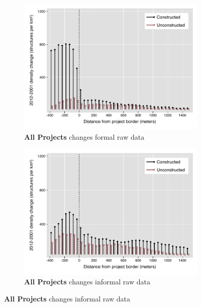 \documentclass[12pt]{article}
\begin{document}
\begin{figure}
        \centering
        \begin{subfigure}[b]{0.48\textwidth}
            \caption[Network2]%
            {{\footnotesize \textbf{All Projects} changes formal raw data}}    
            \label{fig:prefor}
            \centering
            \includegraphics[width=\textwidth,trim={0.3cm .3cm 0.1cm 0cm}, clip=true]{figures/bblu_for_rawchanges_4_30k.pdf}

        \end{subfigure}
        \hfill
        \begin{subfigure}[b]{0.48\textwidth}  
                    \caption[]%
            {{\footnotesize \textbf{All Projects} changes informal  raw data}}      
            \label{fig:preinf}
            \centering 
            \includegraphics[width=\textwidth,trim={0.3cm .3cm 0.1cm 0cm}, clip=true]{figures/bblu_inf_rawchanges_4_30k.pdf}


\end{subfigure}
\end{figure}
\end{document}
